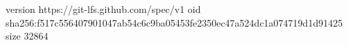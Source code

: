 version https://git-lfs.github.com/spec/v1
oid sha256:f517c556407901047ab54c6c9ba05453fe2350ec47a524dc1a074719d1d91425
size 32864
